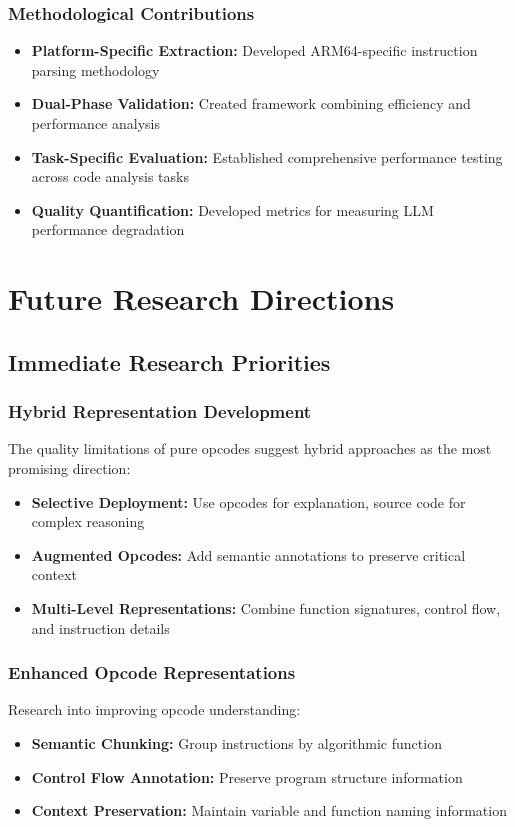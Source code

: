 \documentclass[11pt,a4paper]{article}
\begin{document}
\subsubsection{Methodological Contributions}
\begin{itemize}
    \item \textbf{Platform-Specific Extraction:} Developed ARM64-specific instruction parsing methodology
    \item \textbf{Dual-Phase Validation:} Created framework combining efficiency and performance analysis
    \item \textbf{Task-Specific Evaluation:} Established comprehensive performance testing across code analysis tasks
    \item \textbf{Quality Quantification:} Developed metrics for measuring LLM performance degradation
\end{itemize}

\section{Future Research Directions}

\subsection{Immediate Research Priorities}

\subsubsection{Hybrid Representation Development}
The quality limitations of pure opcodes suggest hybrid approaches as the most promising direction:

\begin{itemize}
    \item \textbf{Selective Deployment:} Use opcodes for explanation, source code for complex reasoning
    \item \textbf{Augmented Opcodes:} Add semantic annotations to preserve critical context
    \item \textbf{Multi-Level Representations:} Combine function signatures, control flow, and instruction details
\end{itemize}

\subsubsection{Enhanced Opcode Representations}
Research into improving opcode understanding:
\begin{itemize}
    \item \textbf{Semantic Chunking:} Group instructions by algorithmic function
    \item \textbf{Control Flow Annotation:} Preserve program structure information
    \item \textbf{Context Preservation:} Maintain variable and function naming information
\end{itemize}
\end{document}
